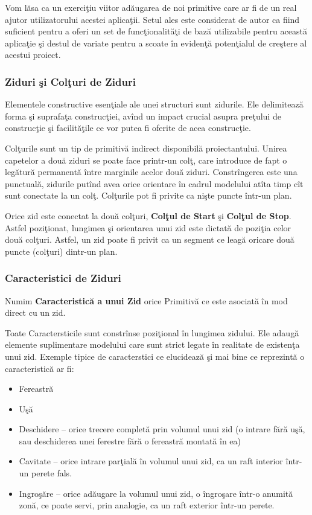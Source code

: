 Vom lăsa ca un exerciţiu viitor adăugarea de noi primitive care ar fi de un 
real ajutor utilizatorului acestei aplicaţii. Setul ales este considerat de 
autor ca fiind suficient pentru a oferi un set de funcţionalităţi de bază 
utilizabile pentru această aplicaţie şi destul de variate pentru a scoate în 
evidenţă potenţialul de creştere al acestui proiect.

\subsubsection{Ziduri şi Colţuri de Ziduri}

Elementele constructive esenţiale ale unei structuri sunt zidurile. Ele 
delimitează forma şi suprafaţa construcţiei, avînd un impact crucial asupra 
preţului de construcţie şi facilităţile ce vor putea fi oferite de acea 
construcţie.

Colţurile sunt un tip de primitivă indirect disponibilă proiectantului. Unirea 
capetelor a două ziduri se poate face printr-un colţ, care introduce de fapt o 
legătură permanentă între marginile acelor două ziduri. Constrîngerea este una 
punctuală, zidurile putînd avea orice orientare în cadrul modelului atîta timp 
cît sunt conectate la un colţ. Colţurile pot fi privite ca nişte puncte într-un 
plan.

Orice zid este conectat la două colţuri, \textbf{Colţul de Start} şi 
\textbf{Colţul de Stop}. Astfel poziţionat, lungimea şi orientarea unui zid 
este dictată de poziţia celor două colţuri. Astfel, un zid poate fi privit ca 
un segment ce leagă oricare două puncte (colţuri) dintr-un plan.

\subsubsection{Caracteristici de Ziduri}

\begin{definition}
\label{define:feature}
Numim \textbf{Caracteristică a unui Zid} orice Primitivă ce este asociată în 
mod direct cu un zid.
\end{definition}

Toate Caractersticile sunt constrînse poziţional în lungimea zidului. Ele 
adaugă elemente suplimentare modelului care sunt strict legate în realitate de 
existenţa unui zid. Exemple tipice de caracterstici ce elucidează şi mai bine 
ce reprezintă o caracteristică ar fi:

\begin{itemize}
  \item Fereastră
  \item Uşă
  \item Deschidere -- orice 
trecere completă prin volumul unui zid (o intrare fără
  uşă, sau deschiderea 
unei ferestre fără o fereastră montată în ea)
  \item Cavitate -- orice intrare 
parţială în volumul unui zid, ca un raft
  interior într-un perete fals.
\item Ingroşăre -- orice adăugare la volumul unui zid, o îngroşare într-o 
anumită zonă, ce poate servi, prin analogie, ca un raft exterior într-un 
perete.
\end{itemize}
  
